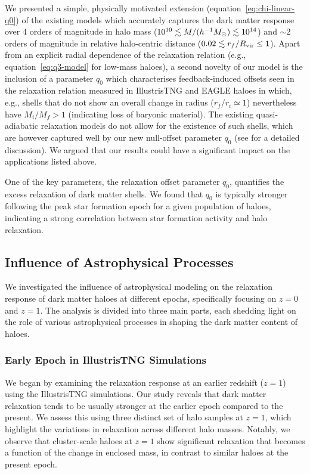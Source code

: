 We presented a simple, physically motivated extension (equation~\ref{eq:chi-linear-q0}) of the existing models which accurately captures the dark matter response over 4 orders of magnitude in halo mass ($10^{10}\lesssim M/(h^{-1}M_{\odot})\lesssim 10^{14}$) and $\sim2$ orders of magnitude in relative halo-centric distance ($0.02\lesssim r_f/R_{\rm vir}\leq1$). Apart from an explicit radial dependence of the relaxation relation (e.g., equation~\ref{eq:q3-model} for low-mass haloes), a second novelty of our model is the inclusion of a parameter $q_0$ which characterises feedback-induced offsets seen in the relaxation relation measured in IllustrisTNG and EAGLE haloes in which, e.g., shells that do not show an overall change in radius ($r_f/r_i\simeq1$) nevertheless have $M_i/M_f>1$ (indicating loss of baryonic material). The existing quasi-adiabatic relaxation models do not allow for the existence of such shells, which are however captured well by our new null-offset parameter $q_0$ (see  for a detailed discussion).
We argued that our results could have a significant impact on the applications listed above.

One of the key parameters, the relaxation offset parameter \( q_0 \), quantifies the excess relaxation of dark matter shells. We found that \( q_0 \) is typically stronger following the peak star formation epoch for a given population of haloes, indicating a strong correlation between star formation activity and halo relaxation.

\subsection{Influence of Astrophysical Processes}
We investigated the influence of astrophysical modeling on the relaxation response of dark matter haloes at different epochs, specifically focusing on \( z=0 \) and \( z=1 \). The analysis is divided into three main parts, each shedding light on the role of various astrophysical processes in shaping the dark matter content of haloes.

\subsubsection*{Early Epoch in IllustrisTNG Simulations}
We began by examining the relaxation response at an earlier redshift (\( z=1 \)) using the IllustrisTNG simulations. Our study reveals that dark matter relaxation tends to be usually stronger at the earlier epoch compared to the present. We assess this using three distinct set of halo samples at \(z=1\), which highlight the variations in relaxation across different halo masses. Notably, we observe that cluster-scale haloes at \( z=1 \) show significant relaxation that becomes a function of the change in enclosed mass, in contrast to similar haloes at the present epoch.

